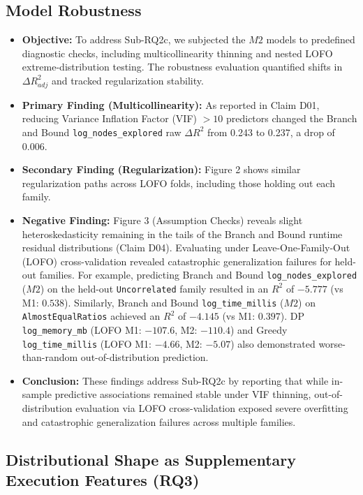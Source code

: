 \documentclass[11pt,a4paper]{article}
\begin{document}
\subsection{Model Robustness}\label{sec:robustness}
\begin{itemize}
  \item \textbf{Objective:} To address Sub-RQ2c, we subjected the $M2$ models to predefined diagnostic checks, including multicollinearity thinning and nested LOFO extreme-distribution testing. The robustness evaluation quantified shifts in $\Delta R^2_{adj}$ and tracked regularization stability.
  \item \textbf{Primary Finding (Multicollinearity):} As reported in Claim D01, reducing Variance Inflation Factor (VIF) $> 10$ predictors changed the Branch and Bound \texttt{log\_nodes\_explored} raw $\Delta R^2$ from 0.243 to 0.237, a drop of 0.006.
  \item \textbf{Secondary Finding (Regularization):} Figure 2 shows similar regularization paths across LOFO folds, including those holding out each family.
  \item \textbf{Negative Finding:} Figure 3 (Assumption Checks) reveals slight heteroskedasticity remaining in the tails of the Branch and Bound runtime residual distributions (Claim D04). Evaluating under Leave-One-Family-Out (LOFO) cross-validation revealed catastrophic generalization failures for held-out families. For example, predicting Branch and Bound \texttt{log\_nodes\_explored} ($M2$) on the held-out \texttt{Uncorrelated} family resulted in an $R^2$ of $-5.777$ (vs M1: $0.538$). Similarly, Branch and Bound \texttt{log\_time\_millis} ($M2$) on \texttt{AlmostEqualRatios} achieved an $R^2$ of $-4.145$ (vs M1: $0.397$). DP \texttt{log\_memory\_mb} (LOFO M1: $-107.6$, M2: $-110.4$) and Greedy \texttt{log\_time\_millis} (LOFO M1: $-4.66$, M2: $-5.07$) also demonstrated worse-than-random out-of-distribution prediction.
  \item \textbf{Conclusion:} These findings address Sub-RQ2c by reporting that while in-sample predictive associations remained stable under VIF thinning, out-of-distribution evaluation via LOFO cross-validation exposed severe overfitting and catastrophic generalization failures across multiple families.
\end{itemize}

\subsection{Distributional Shape as Supplementary Execution Features (RQ3)}\label{sec:rq3}
\end{document}
